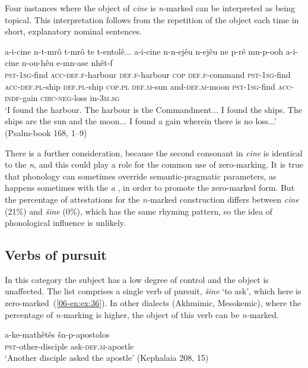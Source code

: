\documentclass[output=paper]{LSP/langsci}
\begin{document}
Four instances where the object of \textit{cine} is \textit{n-}marked can be interpreted as being topical. This interpretation follows from the repetition of the object each time in short, explanatory nominal sentences.

\begin{exe}
\ex \label{06-en:ex:35}
\gll a-i-cine 		n-t-mrô 				t-mrô 	te 		t-entolê... a-i-cine 		n-n-ejêu 			n-ejêu 	ne 		p-rê 		mn-p-ooh a-i-cine 		n-ou-hêu 		e-mn-ase 		{\ob}nhêt-f{\cb}\\
	\textsc{pst-}\textsc{1sg-}find \textsc{acc-def.f-}harbour \textsc{def.f-}harbour \textsc{cop} \textsc{def.f-}command \textsc{pst-}\textsc{1sg-}find \textsc{acc-def.pl-}ship \textsc{def.pl-}ship \textsc{cop.pl} \textsc{def.m-}sun and-\textsc{def.m-}moon \textsc{pst-}\textsc{1sg-}find \textsc{acc-indf-}gain \textsc{circ-neg-}loss in-\textsc{3m.sg}\\
\glt ‘I found the harbour. The harbour is the Commandment... I found the ships. The ships are the sun and the moon... I found a gain wherein there is no loss...’ (Psalm-book 168, 1–9)
\end{exe}

There is a further consideration, because the second consonant in \textit{cine} is identical to the  \textit{n}, and this could play a role for the common use of zero-marking. It is true that phonology can sometimes override semantic-pragmatic parameters, as happens sometimes with the  \textit{a} \citep[108]{Kliffer1995Kinesis}, in order to promote the zero-marked form. But the percentage of attestations for the \textit{n-}marked construction differs between \textit{cine} (21\%) and \textit{šine} (0\%), which has the same rhyming pattern, so the idea of phonological influence is unlikely. 

\subsection{Verbs of pursuit}
\label{06-en-sec:5-4}

In this category the subject has a low degree of control and the object is unaffected. The list comprises a single verb of pursuit, \textit{š}\textit{ine} ‘to ask’, which here is zero-marked~(\ref{06-en:ex:36}). In other dialects (Akhmimic, Mesokemic), where the percentage of \textit{n-}marking is higher, the object of this verb can be \textit{n-}marked.

\begin{exe}
\ex \label{06-en:ex:36}
\gll a-ke-mathêtês 			šn-p-apostolos \\
	\textsc{pst-}other-disciple ask-\textsc{def.m-}apostle\\
\glt ‘Another disciple asked the apostle’ (Kephalaia 208, 15)
\end{exe}
\end{document}
